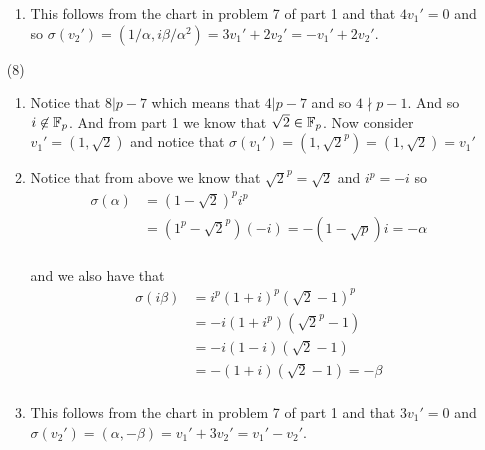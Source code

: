 \documentclass[12pt]{amsart}
\begin{document}
\begin{itemize}
\begin{enumerate}[label=(\alph*)]
        \item This follows from the chart in problem 7 of part 1 and that $4v_1'=0$ and so $\sigma(v_2')=(1/\alpha, i\beta/\alpha^2)=3v_1'+2v_2'=-v_1'+2v_2'$.\\
    \end{enumerate}
    \item[(8)] 
    \begin{enumerate}[label=(\alph*)]
        \item Notice that $8|p-7$ which means that $4|p-7$ and so $4\nmid p-1$. And so $i\not\in \mathbb{F}_p$. And from part 1 we know that $\sqrt{2}\in\mathbb{F}_p$. Now consider $v_1'=(1,\sqrt{2})$ and notice that $\sigma(v_1')=(1,\sqrt{2}^p)=(1,\sqrt 2)=v_1'$\\
        
        \item Notice that from above we know that $\sqrt{2}^p=\sqrt{2}$ and $i^p=-i$ so
        \begin{align*}
            \sigma(\alpha)&=(1-\sqrt{2})^pi^p\\
            &=(1^p-\sqrt{2}^p)(-i)= -(1-\sqrt p) i=-\alpha\\
        \end{align*}

        and we also have that
        \begin{align*}
            \sigma(i\beta)&=i^p(1+i)^p(\sqrt{2}-1)^p\\
            &=-i(1+i^p)(\sqrt{2}^p-1)\\
            &=-i(1-i)(\sqrt{2}-1)\\
            &=-(1+i)(\sqrt{2}-1)=-\beta\\
        \end{align*}
        
        \item This follows from the chart in problem 7 of part 1 and that $3v_1'=0$ and $\sigma(v_2')=(\alpha, -\beta)=v_1'+3v_2'=v_1'-v_2'$.\\
    \end{enumerate}
\end{itemize}
\end{document}
